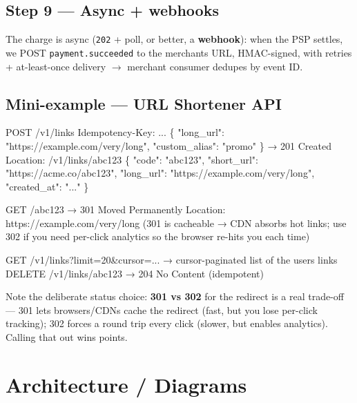 \documentclass[11pt]{article}
\newenvironment{Shaded}{\begin{snugshade}}{\end{snugshade}}
\newcommand{\NormalTok}[1]{\textcolor[rgb]{0.81,0.81,0.76}{#1}}
\begin{document}
\subsection{Step 9 --- Async + webhooks}\label{step-9--async--webhooks}

The charge is async (\texttt{202} + poll, or better, a \textbf{webhook}): when the PSP settles, we POST \texttt{payment.succeeded} to the merchant\textquotesingle s URL, HMAC-signed, with retries + at-least-once delivery \(\rightarrow\) merchant consumer dedupes by event ID.

\subsection{Mini-example --- URL Shortener API}\label{mini-example--url-shortener-api}


\begin{Shaded}
\begin{Highlighting}[]
\NormalTok{POST /v1/links}
\NormalTok{Idempotency{-}Key: ...}
\NormalTok{\{ "long\_url": "https://example.com/very/long", "custom\_alias": "promo" \}}
\NormalTok{→ 201 Created}
\NormalTok{  Location: /v1/links/abc123}
\NormalTok{\{ "code": "abc123", "short\_url": "https://acme.co/abc123",}
\NormalTok{  "long\_url": "https://example.com/very/long", "created\_at": "..." \}}

\NormalTok{GET /abc123          → 301 Moved Permanently   Location: https://example.com/very/long}
\NormalTok{                      (301 is cacheable → CDN absorbs hot links; use 302 if you need}
\NormalTok{                       per{-}click analytics so the browser re{-}hits you each time)}

\NormalTok{GET /v1/links?limit=20\&cursor=...     → cursor{-}paginated list of the user\textquotesingle{}s links}
\NormalTok{DELETE /v1/links/abc123               → 204 No Content (idempotent)}
\end{Highlighting}
\end{Shaded}

Note the deliberate status choice: \textbf{301 vs 302} for the redirect is a real trade-off --- 301 lets browsers/CDNs cache the redirect (fast, but you lose per-click tracking); 302 forces a round trip every click (slower, but enables analytics). Calling that out wins points.

\section{Architecture / Diagrams}\label{architecture--diagrams}
\end{document}

